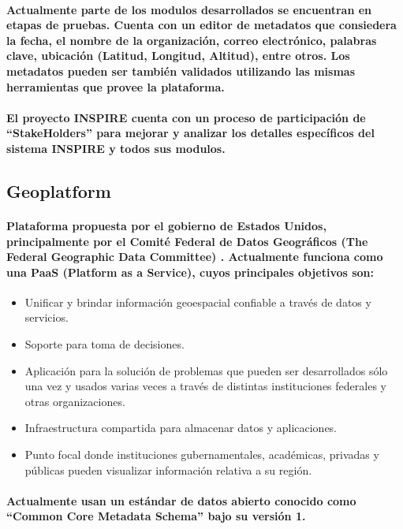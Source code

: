     \paragraph{Actualmente parte de los modulos desarrollados se encuentran en etapas de pruebas. Cuenta con un editor de metadatos que consiedera la fecha, el nombre de la organización, correo electrónico, palabras clave, ubicación (Latitud, Longitud, Altitud), entre otros. Los metadatos pueden ser también validados utilizando las mismas herramientas que provee la plataforma.}
    \paragraph{El proyecto INSPIRE cuenta con un proceso de participación de ``StakeHolders'' para mejorar y analizar los detalles específicos del sistema INSPIRE y todos sus modulos.}
  \subsection{Geoplatform}
    \paragraph{Plataforma propuesta por el gobierno de Estados Unidos, principalmente por el Comité Federal de Datos Geográficos (The Federal Geographic Data Committee) \cite{19}. Actualmente funciona como una PaaS (Platform as a Service), cuyos principales objetivos son:}
    \begin{itemize}
      \item {Unificar y brindar información geoespacial confiable a través de datos y servicios.}
      \item {Soporte para toma de decisiones.}
      \item{Aplicación para la solución de problemas que pueden ser desarrollados sólo una vez y usados varias veces a través de distintas instituciones federales y otras organizaciones.}
      \item{Infraestructura compartida para almacenar datos y aplicaciones.}
      \item{Punto focal donde instituciones gubernamentales, académicas, privadas y públicas pueden visualizar información relativa a su región.}
  \end{itemize}
  \paragraph{Actualmente usan un estándar de datos abierto conocido como “Common Core Metadata Schema” bajo su versión 1. \cite{20}}

